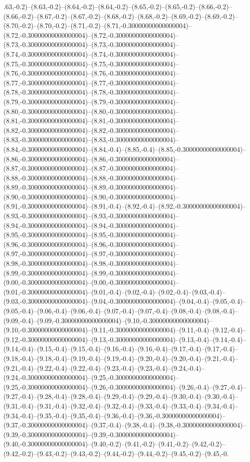 .63,-0.2)--(8.63,-0.2)--(8.64,-0.2)--(8.64,-0.2)--(8.65,-0.2)--(8.65,-0.2)--(8.66,-0.2)--(8.66,-0.2)--(8.67,-0.2)--(8.67,-0.2)--(8.68,-0.2)--(8.68,-0.2)--(8.69,-0.2)--(8.69,-0.2)--(8.70,-0.2)--(8.70,-0.2)--(8.71,-0.2)--(8.71,-0.30000000000000004)--(8.72,-0.30000000000000004)--(8.72,-0.30000000000000004)--(8.73,-0.30000000000000004)--(8.73,-0.30000000000000004)--(8.74,-0.30000000000000004)--(8.74,-0.30000000000000004)--(8.75,-0.30000000000000004)--(8.75,-0.30000000000000004)--(8.76,-0.30000000000000004)--(8.76,-0.30000000000000004)--(8.77,-0.30000000000000004)--(8.77,-0.30000000000000004)--(8.78,-0.30000000000000004)--(8.78,-0.30000000000000004)--(8.79,-0.30000000000000004)--(8.79,-0.30000000000000004)--(8.80,-0.30000000000000004)--(8.80,-0.30000000000000004)--(8.81,-0.30000000000000004)--(8.81,-0.30000000000000004)--(8.82,-0.30000000000000004)--(8.82,-0.30000000000000004)--(8.83,-0.30000000000000004)--(8.83,-0.30000000000000004)--(8.84,-0.30000000000000004)--(8.84,-0.4)--(8.85,-0.4)--(8.85,-0.30000000000000004)--(8.86,-0.30000000000000004)--(8.86,-0.30000000000000004)--(8.87,-0.30000000000000004)--(8.87,-0.30000000000000004)--(8.88,-0.30000000000000004)--(8.88,-0.30000000000000004)--(8.89,-0.30000000000000004)--(8.89,-0.30000000000000004)--(8.90,-0.30000000000000004)--(8.90,-0.30000000000000004)--(8.91,-0.30000000000000004)--(8.91,-0.4)--(8.92,-0.4)--(8.92,-0.30000000000000004)--(8.93,-0.30000000000000004)--(8.93,-0.30000000000000004)--(8.94,-0.30000000000000004)--(8.94,-0.30000000000000004)--(8.95,-0.30000000000000004)--(8.95,-0.30000000000000004)--(8.96,-0.30000000000000004)--(8.96,-0.30000000000000004)--(8.97,-0.30000000000000004)--(8.97,-0.30000000000000004)--(8.98,-0.30000000000000004)--(8.98,-0.30000000000000004)--(8.99,-0.30000000000000004)--(8.99,-0.30000000000000004)--(9.00,-0.30000000000000004)--(9.00,-0.30000000000000004)--(9.01,-0.30000000000000004)--(9.01,-0.4)--(9.02,-0.4)--(9.02,-0.4)--(9.03,-0.4)--(9.03,-0.30000000000000004)--(9.04,-0.30000000000000004)--(9.04,-0.4)--(9.05,-0.4)--(9.05,-0.4)--(9.06,-0.4)--(9.06,-0.4)--(9.07,-0.4)--(9.07,-0.4)--(9.08,-0.4)--(9.08,-0.4)--(9.09,-0.4)--(9.09,-0.30000000000000004)--(9.10,-0.30000000000000004)--(9.10,-0.30000000000000004)--(9.11,-0.30000000000000004)--(9.11,-0.4)--(9.12,-0.4)--(9.12,-0.30000000000000004)--(9.13,-0.30000000000000004)--(9.13,-0.4)--(9.14,-0.4)--(9.14,-0.4)--(9.15,-0.4)--(9.15,-0.4)--(9.16,-0.4)--(9.16,-0.4)--(9.17,-0.4)--(9.17,-0.4)--(9.18,-0.4)--(9.18,-0.4)--(9.19,-0.4)--(9.19,-0.4)--(9.20,-0.4)--(9.20,-0.4)--(9.21,-0.4)--(9.21,-0.4)--(9.22,-0.4)--(9.22,-0.4)--(9.23,-0.4)--(9.23,-0.4)--(9.24,-0.4)--(9.24,-0.30000000000000004)--(9.25,-0.30000000000000004)--(9.25,-0.30000000000000004)--(9.26,-0.30000000000000004)--(9.26,-0.4)--(9.27,-0.4)--(9.27,-0.4)--(9.28,-0.4)--(9.28,-0.4)--(9.29,-0.4)--(9.29,-0.4)--(9.30,-0.4)--(9.30,-0.4)--(9.31,-0.4)--(9.31,-0.4)--(9.32,-0.4)--(9.32,-0.4)--(9.33,-0.4)--(9.33,-0.4)--(9.34,-0.4)--(9.34,-0.4)--(9.35,-0.4)--(9.35,-0.4)--(9.36,-0.4)--(9.36,-0.30000000000000004)--(9.37,-0.30000000000000004)--(9.37,-0.4)--(9.38,-0.4)--(9.38,-0.30000000000000004)--(9.39,-0.30000000000000004)--(9.39,-0.30000000000000004)--(9.40,-0.30000000000000004)--(9.40,-0.2)--(9.41,-0.2)--(9.41,-0.2)--(9.42,-0.2)--(9.42,-0.2)--(9.43,-0.2)--(9.43,-0.2)--(9.44,-0.2)--(9.44,-0.2)--(9.45,-0.2)--(9.45,-0.